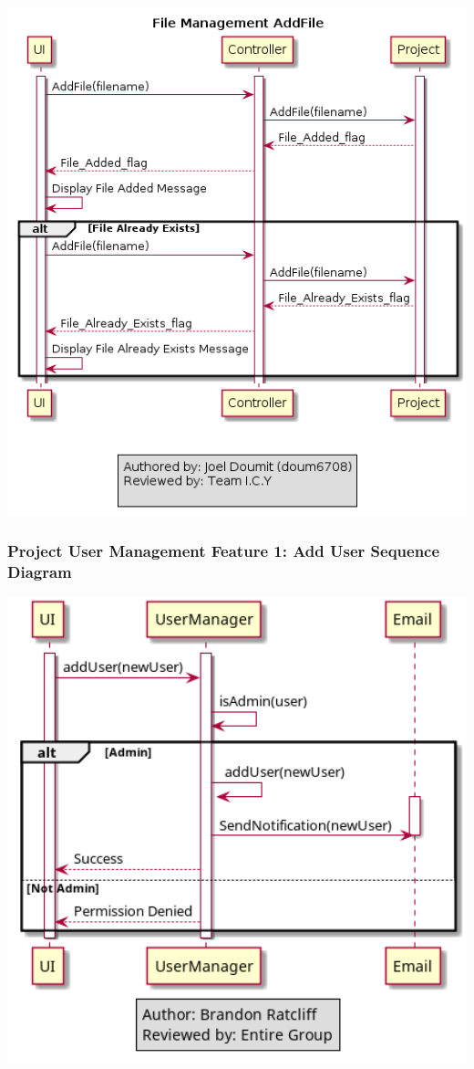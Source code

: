 \documentclass[twoside,letterpaper]{article}
\begin{document}
	\includegraphics[width=6.0in]{images/SequenceDiagrams/FM_AddFile_Image}
	
	\newpage
	
	\subsubsection[Project User Management Feature 1: Add User Sequence Diagram]{\rmfamily\bfseries\color{black}
		Project User Management Feature 1: Add User Sequence Diagram}
	\hypertarget{RefHeading22059017292}{}
	
	\includegraphics[width=6.0in]{images/SequenceDiagrams/ProjectUserManagementAddUser}
	
\end{document}
